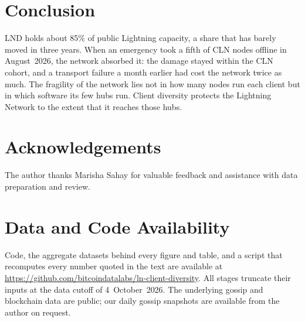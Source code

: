 \documentclass[conference]{IEEEtran}
\begin{document}
\section{Conclusion}
\label{sec:conclusion}
LND holds about 85\% of public Lightning capacity, a share that has barely moved in three years. When an emergency
took a fifth of CLN nodes offline in August~2026, the network absorbed it: the damage stayed within the CLN cohort,
and a transport failure a month earlier had cost the network twice as much. The fragility of the network lies not in
how many nodes run each client but in which software its few hubs run. Client diversity protects the Lightning
Network to the extent that it reaches those hubs.

\section*{Acknowledgements}
The author thanks Marisha Sahay for valuable feedback and assistance with data preparation and review.

\section*{Data and Code Availability}
Code, the aggregate datasets behind every figure and table, and a script that recomputes every number quoted in the
text are available at \url{https://github.com/bitcoindatalabs/ln-client-diversity}. All stages truncate their inputs at the data cutoff of
4~October~2026. The underlying gossip and blockchain data are public; our daily gossip snapshots are available from
the author on request.



\end{document}
